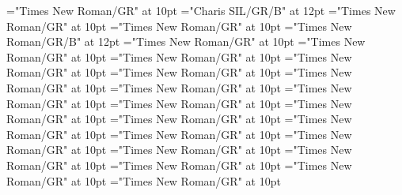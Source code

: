 \documentclass[gps1,twoside]{article}
\begin{document}
\font\spanowningentrysummarydefinitionvisiblecomplexformbackrefvisiblecomplexformbackrefsminorentrycomplexlastchildafter="Times New Roman/GR" at 10pt
\font\spanbzhheadwordminorentryvariant="Charis SIL/GR/B" at 12pt
\font\spanspanheadwordminorentryvariantbefore="Times New Roman/GR" at 10pt
\font\spanheadwordminorentryvariantlastchildafter="Times New Roman/GR" at 10pt
\font\spanheadwordminorentryvariant="Times New Roman/GR/B" at 12pt
\font\pronunciationpronunciationpronunciationsminorentryvariantbefore="Times New Roman/GR" at 10pt
\font\pronunciationsminorentryvariantafter="Times New Roman/GR" at 10pt
\font\spanspanformpronunciationpronunciationsminorentryvariantbefore="Times New Roman/GR" at 10pt
\font\spanformpronunciationpronunciationsminorentryvariantfirstchildbefore="Times New Roman/GR" at 10pt
\font\spanformpronunciationpronunciationsminorentryvariantlastchildafter="Times New Roman/GR" at 10pt
\font\spanspanvariantformentrybackrefsminorentryvariantbefore="Times New Roman/GR" at 10pt
\font\variantformentrybackrefsminorentryvariantbefore="Times New Roman/GR" at 10pt
\font\variantformentrybackrefsminorentryvariantafter="Times New Roman/GR" at 10pt
\font\variantentrytypevariantentrytypevariantentrytypesvariantformentrybackrefvariantformentrybackrefsminorentryvariantbefore="Times New Roman/GR" at 10pt
\font\variantentrytypesvariantformentrybackrefvariantformentrybackrefsminorentryvariantafter="Times New Roman/GR" at 10pt
\font\spanspanreverseabbrvariantentrytypevariantentrytypesvariantformentrybackrefvariantformentrybackrefsminorentryvariantbefore="Times New Roman/GR" at 10pt
\font\spanreverseabbrvariantentrytypevariantentrytypesvariantformentrybackrefvariantformentrybackrefsminorentryvariantlastchildafter="Times New Roman/GR" at 10pt
\font\spanspanheadwordvariantformentrybackrefvariantformentrybackrefsminorentryvariantbefore="Times New Roman/GR" at 10pt
\font\spanspanowningentrysummarydefinitionvariantformentrybackrefvariantformentrybackrefsminorentryvariantbefore="Times New Roman/GR" at 10pt
\font\spanowningentrysummarydefinitionvariantformentrybackrefvariantformentrybackrefsminorentryvariantlastchildafter="Times New Roman/GR" at 10pt
\font\spanspanvisiblevariantentryrefsminorentryvariantbefore="Times New Roman/GR" at 10pt
\font\visiblevariantentryrefsminorentryvariantafter="Times New Roman/GR" at 10pt
\font\variantentrytypevariantentrytypevariantentrytypesvisiblevariantentryrefvisiblevariantentryrefsminorentryvariantbefore="Times New Roman/GR" at 10pt
\font\variantentrytypesvisiblevariantentryrefvisiblevariantentryrefsminorentryvariantafter="Times New Roman/GR" at 10pt
\end{document}
